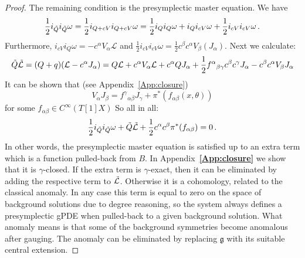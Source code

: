 \documentclass[a4paper,12pt]{article}
\numberwithin{equation}{section} %
\newcommand{\bref}[1]{\textbf{\ref{#1}}}
\newcommand{\Liealg}{\mathfrak}
\newcommand{\algg}{\Liealg{g}}
\def\cL{\mathcal{L}}
\begin{document}
\begin{proof}
The remaining condition is the presymplectic master equation. We have
\begin{equation}
    \frac{1}{2}i_{\Tilde{Q}} i_{\Tilde{Q}} \omega = \frac{1}{2} i_{Q + cV} i_{Q+cV} \omega = \frac{1}{2}i_Q i_Q \omega + i_Q i_{cV}\omega + \frac{1}{2}i_{cV}i_{cV} \omega  \,.
\end{equation}
Furthermore, $i_{cV}i_Q\omega = -c^\alpha V_\alpha \cL$ and $\frac{1}{2}i_{cV}i_{cV}\omega = \frac{1}{2}c^\beta c^\alpha V_{\beta}(J_\alpha)$. 
Next we calculate:
\begin{equation}
    \Tilde{Q}\Tilde{\cL} = (Q + q)(\cL - c^\alpha J_\alpha) = Q\cL + c^\alpha V_\alpha \cL + c^\alpha Q J_\alpha + \frac{1}{2}f^\alpha{ }_{\beta\gamma}c^\beta c^\gamma J_\alpha - c^\beta c^\alpha V_\beta J_\alpha 
\end{equation}
It can be shown that (see Appendix~\ref{App:closure}) 
\begin{equation}
    V_\alpha J_\beta = f^\gamma{ }_{\alpha\beta}J_\gamma + \pi^*(f_{\alpha\beta}(x,\theta))
\end{equation}
for some $f_{\alpha\beta} \in C^\infty(T[1]X)$
So all in all:
\begin{equation}\label{backg-premapster-gen}
    \frac{1}{2}i_{\Tilde{Q}} i_{\Tilde{Q}} \omega + \Tilde{Q}\Tilde{\cL} + \frac{1}{2}c^\alpha c^\beta \pi^*(f_{\alpha\beta}) = 0\,.
\end{equation}
In other words, the presymplectic master equation is satisfied up to an extra term which is a function pulled-back from $B$. In  Appendix~\bref{App:closure} we show that it is $\gamma$-closed. If the extra term is $\gamma$-exact, then it can be eliminated by adding the respective term to $\Tilde{\cL}$. Otherwise it is a cohomology, related to the classical anomaly. In any case this term is equal to zero on the space of background solutions due to degree reasoning, so the system always defines a presymplectic gPDE  when pulled-back to a given background solution. What anomaly means is that some of the  background symmetries become anomalous after gauging. The anomaly can be eliminated by replacing $\algg$ with its suitable central extension.
\end{proof}
\end{document}
